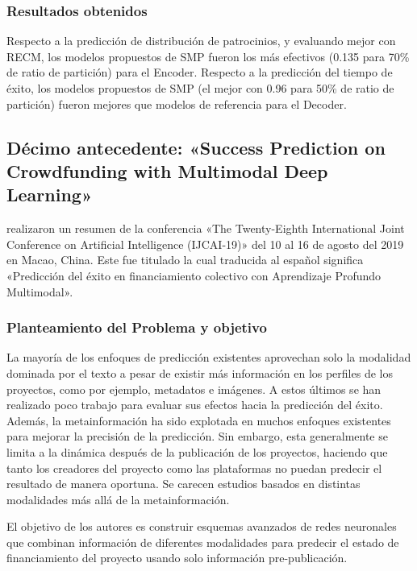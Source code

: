 \subsubsection{Resultados obtenidos}
Respecto a la predicción de distribución de patrocinios, y evaluando mejor con RECM, los modelos propuestos de SMP fueron los más efectivos (0.135 para 70\% de ratio de partición) para el Encoder.
Respecto a la predicción del tiempo de éxito, los modelos propuestos de SMP (el mejor con 0.96 para 50\% de ratio de partición) fueron mejores que modelos de referencia para el Decoder.

\subsection{Décimo antecedente: «Success Prediction on Crowdfunding with Multimodal Deep Learning» \citep*{pr_cheng2019deeplearning}}
\citeauthor{pr_cheng2019deeplearning} realizaron un resumen de la conferencia «The Twenty-Eighth International Joint Conference on Artificial Intelligence (IJCAI-19)» del 10 al 16 de agosto del 2019 en Macao, China. Este fue titulado  la cual traducida al español significa «Predicción del éxito en financiamiento colectivo con Aprendizaje Profundo Multimodal».

\subsubsection{Planteamiento del Problema y objetivo}
La mayoría de los enfoques de predicción existentes aprovechan solo la modalidad dominada por el texto a pesar de existir más información en los perfiles de los proyectos, como por ejemplo, metadatos e imágenes. A estos últimos se han realizado poco trabajo para evaluar sus efectos hacia la predicción del éxito. Además, la metainformación ha sido explotada en muchos enfoques existentes para mejorar la precisión de la predicción. Sin embargo, esta generalmente se limita a la dinámica después de la publicación de los proyectos, haciendo que tanto los creadores del proyecto como las plataformas no puedan predecir el resultado de manera oportuna. Se carecen estudios basados en distintas modalidades más allá de la metainformación.

El objetivo de los autores es construir esquemas avanzados de redes neuronales que combinan información de diferentes modalidades para predecir el estado de financiamiento del proyecto usando solo información pre-publicación.

